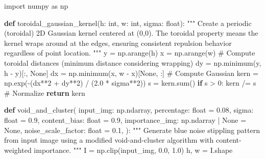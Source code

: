 \documentclass[
  letterpaper,
  DIV=11,
  numbers=noendperiod]{scrartcl}
\newenvironment{Shaded}{\begin{snugshade}}{\end{snugshade}}
\newcommand{\BuiltInTok}[1]{\textcolor[rgb]{0.00,0.23,0.31}{#1}}
\newcommand{\CommentTok}[1]{\textcolor[rgb]{0.37,0.37,0.37}{#1}}
\newcommand{\ControlFlowTok}[1]{\textcolor[rgb]{0.00,0.23,0.31}{\textbf{#1}}}
\newcommand{\DecValTok}[1]{\textcolor[rgb]{0.68,0.00,0.00}{#1}}
\newcommand{\FloatTok}[1]{\textcolor[rgb]{0.68,0.00,0.00}{#1}}
\newcommand{\ImportTok}[1]{\textcolor[rgb]{0.00,0.46,0.62}{#1}}
\newcommand{\KeywordTok}[1]{\textcolor[rgb]{0.00,0.23,0.31}{\textbf{#1}}}
\newcommand{\NormalTok}[1]{\textcolor[rgb]{0.00,0.23,0.31}{#1}}
\newcommand{\OperatorTok}[1]{\textcolor[rgb]{0.37,0.37,0.37}{#1}}
\newcommand{\VariableTok}[1]{\textcolor[rgb]{0.07,0.07,0.07}{#1}}
\begin{document}
\label{stippling-functions}
\begin{Shaded}
\begin{Highlighting}[]
\ImportTok{import}\NormalTok{ numpy }\ImportTok{as}\NormalTok{ np}

\KeywordTok{def}\NormalTok{ toroidal\_gaussian\_kernel(h: }\BuiltInTok{int}\NormalTok{, w: }\BuiltInTok{int}\NormalTok{, sigma: }\BuiltInTok{float}\NormalTok{):}
    \CommentTok{"""}
\CommentTok{    Create a periodic (toroidal) 2D Gaussian kernel centered at (0,0).}
\CommentTok{    The toroidal property means the kernel wraps around at the edges,}
\CommentTok{    ensuring consistent repulsion behavior regardless of point location.}
\CommentTok{    """}
\NormalTok{    y }\OperatorTok{=}\NormalTok{ np.arange(h)}
\NormalTok{    x }\OperatorTok{=}\NormalTok{ np.arange(w)}
    \CommentTok{\# Compute toroidal distances (minimum distance considering wrapping)}
\NormalTok{    dy }\OperatorTok{=}\NormalTok{ np.minimum(y, h }\OperatorTok{{-}}\NormalTok{ y)[:, }\VariableTok{None}\NormalTok{]}
\NormalTok{    dx }\OperatorTok{=}\NormalTok{ np.minimum(x, w }\OperatorTok{{-}}\NormalTok{ x)[}\VariableTok{None}\NormalTok{, :]}
    \CommentTok{\# Compute Gaussian}
\NormalTok{    kern }\OperatorTok{=}\NormalTok{ np.exp(}\OperatorTok{{-}}\NormalTok{(dx}\OperatorTok{**}\DecValTok{2} \OperatorTok{+}\NormalTok{ dy}\OperatorTok{**}\DecValTok{2}\NormalTok{) }\OperatorTok{/}\NormalTok{ (}\FloatTok{2.0} \OperatorTok{*}\NormalTok{ sigma}\OperatorTok{**}\DecValTok{2}\NormalTok{))}
\NormalTok{    s }\OperatorTok{=}\NormalTok{ kern.}\BuiltInTok{sum}\NormalTok{()}
    \ControlFlowTok{if}\NormalTok{ s }\OperatorTok{\textgreater{}} \DecValTok{0}\NormalTok{:}
\NormalTok{        kern }\OperatorTok{/=}\NormalTok{ s  }\CommentTok{\# Normalize}
    \ControlFlowTok{return}\NormalTok{ kern}


\KeywordTok{def}\NormalTok{ void\_and\_cluster(}
\NormalTok{    input\_img: np.ndarray,}
\NormalTok{    percentage: }\BuiltInTok{float} \OperatorTok{=} \FloatTok{0.08}\NormalTok{,}
\NormalTok{    sigma: }\BuiltInTok{float} \OperatorTok{=} \FloatTok{0.9}\NormalTok{,}
\NormalTok{    content\_bias: }\BuiltInTok{float} \OperatorTok{=} \FloatTok{0.9}\NormalTok{,}
\NormalTok{    importance\_img: np.ndarray }\OperatorTok{|} \VariableTok{None} \OperatorTok{=} \VariableTok{None}\NormalTok{,}
\NormalTok{    noise\_scale\_factor: }\BuiltInTok{float} \OperatorTok{=} \FloatTok{0.1}\NormalTok{,}
\NormalTok{):}
    \CommentTok{"""}
\CommentTok{    Generate blue noise stippling pattern from input image using a modified}
\CommentTok{    void{-}and{-}cluster algorithm with content{-}weighted importance.}
\CommentTok{    """}
\NormalTok{    I }\OperatorTok{=}\NormalTok{ np.clip(input\_img, }\FloatTok{0.0}\NormalTok{, }\FloatTok{1.0}\NormalTok{)}
\NormalTok{    h, w }\OperatorTok{=}\NormalTok{ I.shape}


\end{Highlighting}
\end{Shaded}
\end{document}
